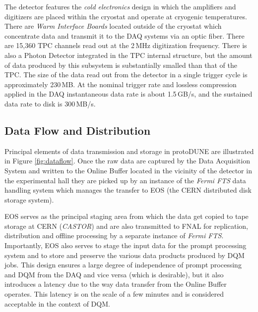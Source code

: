\documentclass{webofc}
\newcommand{\pd}{protoDUNE\xspace}
\begin{document}
The detector features the \textit{cold electronics} design in which the amplifiers and digitizers
are placed within the cryostat and operate at cryogenic temperatures. There are
\textit{Warm Interface Boards} located outside of the cryostat which concentrate data
and transmit it to the DAQ systems via an optic fiber.
There are 15,360 TPC channels read out at the 2\,MHz digitization frequency. There is also
a Photon Detector integrated in the TPC internal structure, but the amount of data
produced by this subsystem is substantially smalled than that of the TPC.
The size of the data read out from the detector in a single trigger cycle is approximately 230\,MB. At the nominal
trigger rate and lossless compression applied in the DAQ instantaneous data rate is about
1.5\,GB/s, and the sustained data rate to disk is 300\,MB/s.

\subsection{Data Flow and Distribution}
Principal elements of data transmission and storage in \pd are illustrated in Figure \ref{fig:dataflow}.
Once the raw data are captured by the Data Acquisition System and written to the Online Buffer
located in the vicinity of the detector in the experimental hall  they are picked up by an instance of
the \textit{Fermi FTS} data handling system \cite{sam,fts} which manages the transfer to EOS \cite{castoreos}
(the CERN distributed disk storage system).

EOS serves as the principal staging area  \cite{eos_role} from which the data get copied to tape
storage at CERN (\textit{CASTOR})  and are also transmitted to FNAL for replication, distribution and
offline processing by a separate instance of \textit{Fermi FTS}.
Importantly, EOS also serves to stage the input data for the prompt processing system and to
store and preserve  the various data products produced by DQM jobs. This design
ensures a large degree of independence of prompt processing and DQM from the DAQ and vice versa
(which is desirable),
but it also introduces a latency due to the way data transfer from the Online Buffer operates. This latency
is on the scale of a few minutes and is considered acceptable in the context of DQM.
\end{document}

